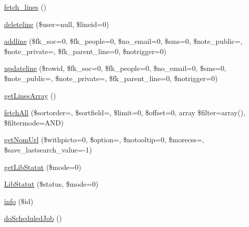 \begin{DoxyCompactItemize}
\item 
\hyperlink{classTourneeGeneric__lines_a2880dfd212b76bb18b6f1feb4f8513ef}{fetch\+\_\+lines} ()
\item 
\hyperlink{classTourneeGeneric__lines_a280da7b38a2b18847431f72d23982ff5}{deleteline} (\$user=null, \$lineid=0)
\item 
\hyperlink{classTourneeGeneric__lines_ac992484c22315c7eb13360699ddf8c12}{addline} (\$fk\+\_\+soc=0, \$fk\+\_\+people=0, \$no\+\_\+email=0, \$sms=0, \$note\+\_\+public=\textquotesingle{}\textquotesingle{}, \$note\+\_\+private=\textquotesingle{}\textquotesingle{}, \$fk\+\_\+parent\+\_\+line=0, \$notrigger=0)
\item 
\hyperlink{classTourneeGeneric__lines_ae2be3c6897d4e8fa8a75693e4399d94d}{updateline} (\$rowid, \$fk\+\_\+soc=0, \$fk\+\_\+people=0, \$no\+\_\+email=0, \$sms=0, \$note\+\_\+public=\textquotesingle{}\textquotesingle{}, \$note\+\_\+private=\textquotesingle{}\textquotesingle{}, \$fk\+\_\+parent\+\_\+line=0, \$notrigger=0)
\item 
\hyperlink{classTourneeGeneric__lines_a1476e62e04d2c97826d06ed0bbe6caaf}{get\+Lines\+Array} ()
\item 
\hyperlink{classTourneeGeneric__lines_ab1dd2a62a299cd4f575bec998bce2427}{fetch\+All} (\$sortorder=\textquotesingle{}\textquotesingle{}, \$sortfield=\textquotesingle{}\textquotesingle{}, \$limit=0, \$offset=0, array \$filter=array(), \$filtermode=\textquotesingle{}A\+ND\textquotesingle{})
\item 
\hyperlink{classTourneeGeneric__lines_a47675ed029f34936a85372c48487279b}{get\+Nom\+Url} (\$withpicto=0, \$option=\textquotesingle{}\textquotesingle{}, \$notooltip=0, \$morecss=\textquotesingle{}\textquotesingle{}, \$save\+\_\+lastsearch\+\_\+value=-\/1)
\item 
\hyperlink{classTourneeGeneric__lines_a2709807f8acd33d09e01a025a7a83f0d}{get\+Lib\+Statut} (\$mode=0)
\item 
\hyperlink{classTourneeGeneric__lines_abe9a6dd0151821840baf7eed020835ce}{Lib\+Statut} (\$status, \$mode=0)
\item 
\hyperlink{classTourneeGeneric__lines_a7bc9b9a42a3c0ecfd8583c8043f706e5}{info} (\$id)
\item 
\hyperlink{classTourneeGeneric__lines_a83f7a2141e6f4f31a6391d960d4e00c5}{do\+Scheduled\+Job} ()
\item 
\mbox{\label{classTourneeGeneric__lines_ad9806ae32c9fa50e69df3ed8efd567cc}} 

\end{DoxyCompactItemize}
